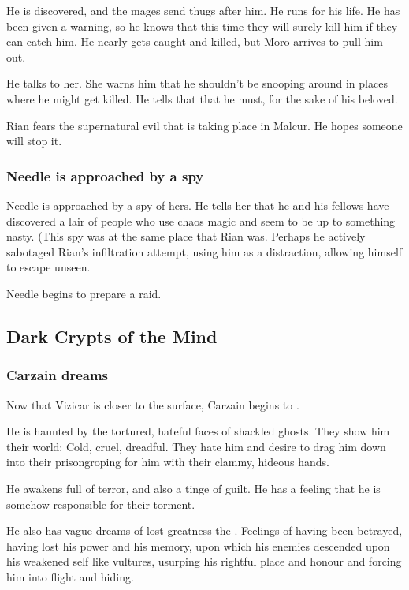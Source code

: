 \begin{garbage}
He is discovered, and the mages send thugs after him. 
He runs for his life. 
He has been given a warning, so he knows that this time they will surely kill him if they can catch him. 
He nearly gets caught and killed, but Moro \Cornel{} arrives to pull him out. 

He talks to her. She warns him that he shouldn't be snooping around in places where he might get killed. He tells that that he must, for the sake of his beloved. 

Rian fears the supernatural evil that is taking place in Malcur. 
He hopes someone will stop it. 





\subsubsection{Needle is approached by a spy}
Needle is approached by a spy of hers. He tells her that he and his fellows have discovered a lair of people who use chaos magic and seem to be up to something nasty. (This spy was at the same place that Rian was. Perhaps he actively sabotaged Rian's infiltration attempt, using him as a distraction, allowing himself to escape unseen. 

Needle begins to prepare a raid. 









\subsection{Dark Crypts of the Mind}
\subsubsection{Carzain dreams}
Now that Vizicar is closer to the surface, Carzain begins to . 

He is haunted by the tortured, hateful faces of shackled ghosts. They show him their world: Cold, cruel, dreadful. They hate him and desire to drag him down into their prison\dash groping for him with their clammy, hideous hands. 

He awakens full of terror, and also a tinge of guilt. He has a feeling that he is somehow responsible for their torment. 

He also has vague dreams of lost greatness\dash {} the . Feelings of having been betrayed, having lost his power and his memory, upon which his enemies descended upon his weakened self like vultures, usurping his rightful place and honour and forcing him into flight and hiding. 


\end{garbage}
